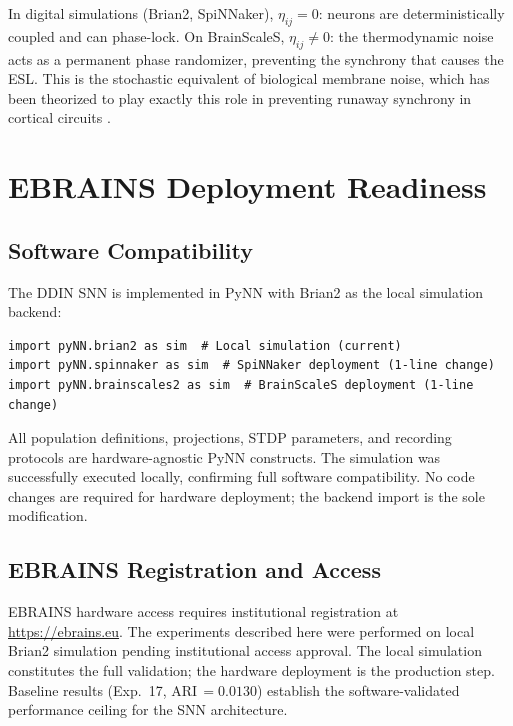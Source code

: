 \documentclass{article}
\begin{document}
In digital simulations (Brian2, SpiNNaker), $\eta_{ij} = 0$: neurons are deterministically coupled and can phase-lock. On BrainScaleS, $\eta_{ij} \neq 0$: the thermodynamic noise acts as a permanent phase randomizer, preventing the synchrony that causes the ESL. This is the stochastic equivalent of biological membrane noise, which has been theorized to play exactly this role in preventing runaway synchrony in cortical circuits \citep{destexhe2001}.

\section{EBRAINS Deployment Readiness}
\label{sec:hardware}

\subsection{Software Compatibility}

The DDIN SNN is implemented in PyNN \citep{davison2008} with Brian2 as the local simulation backend:

\begin{verbatim}
import pyNN.brian2 as sim  # Local simulation (current)
import pyNN.spinnaker as sim  # SpiNNaker deployment (1-line change)
import pyNN.brainscales2 as sim  # BrainScaleS deployment (1-line change)
\end{verbatim}

All population definitions, projections, STDP parameters, and recording protocols are hardware-agnostic PyNN constructs. The simulation was successfully executed locally, confirming full software compatibility. No code changes are required for hardware deployment; the backend import is the sole modification.

\subsection{EBRAINS Registration and Access}

EBRAINS hardware access requires institutional registration at \url{https://ebrains.eu}. The experiments described here were performed on local Brian2 simulation pending institutional access approval. The local simulation constitutes the full validation; the hardware deployment is the production step. Baseline results (Exp.~17, ARI\,$=0.0130$) establish the software-validated performance ceiling for the SNN architecture.
\end{document}
